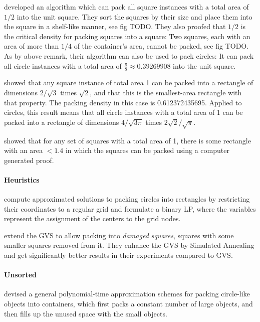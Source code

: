 \textcite{MM1967some} developed an algorithm which can pack all square instances with a total area of $1/2$ into the unit square.
They sort the squares by their size and place them into the square in a shelf-like manner, see fig TODO.
They also proofed that $1/2$ is the critical density for packing squares into a square: Two squares, each with an area of more than $1/4$ of the container's area, cannot be packed, see fig TODO.
As by above remark, their algorithm can also be used to pack circles: It can pack all circle instances with a total area of $\frac{\pi}{8} \approx 0.39269908$ into the unit square.

\textcite{KK1975optimal} showed that any square instance of total area 1 can be packed into a rectangle of dimensions $2/\sqrt{3}$ times $\sqrt{2}$, and that this is the smallest-area rectangle with that property. The packing density in this case is 0.612372435695. Applied to circles, this result means that all circle instances with a total area of 1 can be packed into a rectangle of dimensions $4/\sqrt{3\pi}$ times $2\sqrt{2}/\sqrt{\pi}$.

\textcite{hougardy2011packing} showed that for any set of squares with a total area of 1, there is some rectangle with an area $< 1.4$ in which the squares can be packed using a computer generated proof.


\paragraph{Heuristics}

\textcite{LIE2014approximate} compute approximated solutions to packing circles into rectangles by restricting their coordinates to a regular grid and formulate a binary LP, where the variables represent the assignment of the centers to the grid nodes.

\textcite{ZYC2015packing} extend the GVS to allow packing into \emph{damaged squares}, squares with some smaller squares removed from it. They enhance the GVS by Simulated Annealing and get significantly better results in their experiments compared to GVS.

\paragraph{Unsorted}

\textcite{MPSSW2014polynomial} devised a general polynomial-time approximation schemes for packing circle-like objects into containers, which first packs a constant number of large objects, and then fills up the unused space with the small objects.

